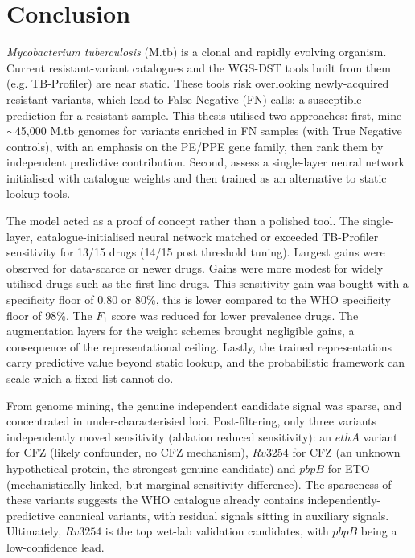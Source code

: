 \sloppy
\chapter{Conclusion}
\textit{Mycobacterium tuberculosis} (M.tb) is a clonal and rapidly evolving organism. Current resistant-variant catalogues and the WGS-DST tools built from them (e.g. TB-Profiler) are near static. These tools risk overlooking newly-acquired resistant variants, which lead to False Negative (FN) calls: a susceptible prediction for a resistant sample. This thesis utilised two approaches: first, mine $\sim$45,000 M.tb genomes for variants enriched in FN samples (with True Negative controls), with an emphasis on the PE/PPE gene family, then rank them by independent predictive contribution. Second, assess a single-layer neural network initialised with catalogue weights and then trained as an alternative to static lookup tools. 

The model acted as a proof of concept rather than a polished tool. The single-layer, catalogue-initialised neural network matched or exceeded TB-Profiler sensitivity for 13/15 drugs (14/15 post threshold tuning). Largest gains were observed for data-scarce or newer drugs. Gains were more modest for widely utilised drugs such as the first-line drugs. This sensitivity gain was bought with a specificity floor of 0.80 or 80\%, this is lower compared to the WHO specificity floor of 98\%. The $F_{1}$ score was reduced for lower prevalence drugs. The augmentation layers for the weight schemes brought negligible gains, a consequence of the representational ceiling. Lastly, the trained representations carry predictive value beyond static lookup, and the probabilistic framework can scale which a fixed list cannot do. 

From genome mining, the genuine independent candidate signal was sparse, and concentrated in under-characterisied loci. Post-filtering, only three variants independently moved sensitivity (ablation reduced sensitivity): an $ethA$ variant for CFZ (likely confounder, no CFZ mechanism), $Rv3254$ for CFZ (an unknown hypothetical protein, the strongest genuine candidate) and $pbpB$ for ETO (mechanistically linked, but marginal sensitivity difference). The sparseness of these variants suggests the WHO catalogue already contains independently-predictive canonical variants, with residual signals sitting in auxiliary signals. Ultimately, $Rv3254$ is the top wet-lab validation candidates, with $pbpB$ being a low-confidence lead. 

